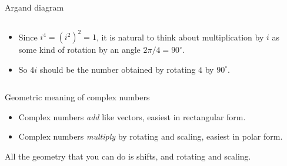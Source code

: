 \documentclass[aspectratio=169]{beamer}
\begin{document}
\begin{frame}{Argand diagram}

\begin{columns}
\begin{column}{.4\textwidth}
\begin{itemize}
  \item Since $ i^4 = (i^2)^2 = 1 $, it is natural to think about multiplication by $ i $ as some kind of rotation by an angle $ 2\pi/4 = 90^\circ $.
  \item So $ 4i $ should be the number obtained by rotating $ 4 $ by $ 90^\circ $.
\end{itemize}

\end{column}
\begin{column}{.6\textwidth}
\end{column}
\end{columns}

\end{frame}

\begin{frame}{Geometric meaning of complex numbers}

\begin{itemize}
  \item Complex numbers \emph{add} like vectors, easiest in rectangular form.
  \item Complex numbers \emph{multiply} by rotating and scaling, easiest in polar form.
\end{itemize}

All the geometry that you can do is shifts, and rotating and scaling.

\end{frame}
\end{document}
